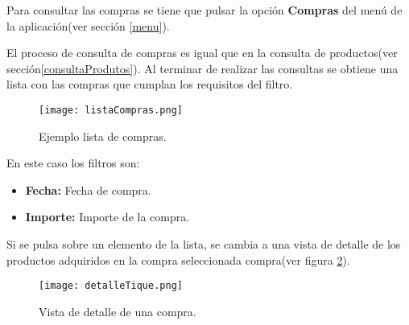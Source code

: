 Para consultar las compras se tiene que pulsar la opción \textbf{Compras} del menú de la aplicación(ver sección \ref{menu}).

El proceso de consulta de compras es igual que en la consulta de productos(ver sección\ref{consultaProdutos}). Al terminar de realizar las consultas se obtiene una lista con las compras que cumplan los requisitos del filtro.
\begin{figure}[ht]
\begin{center}
  \texttt{[image: listaCompras.png]}
  \caption{Ejemplo lista de compras.}\label{fig:listaCompras}
\endminipage 
\end{center}
\end{figure}

En este caso los filtros son:
\begin{itemize}
	\item \textbf{Fecha: }Fecha de compra.
	\item\textbf{Importe: }Importe de la compra.
\end{itemize}

Si se pulsa sobre un elemento de la lista, se cambia a una vista de detalle de los productos adquiridos en la compra seleccionada compra(ver figura \ref{fig:detalleTique}).

\begin{figure}[ht]
\begin{center}
  \texttt{[image: detalleTique.png]}
  \caption{Vista de detalle de una compra.}\label{fig:detalleTique}
\endminipage 
\end{center}
\end{figure}
